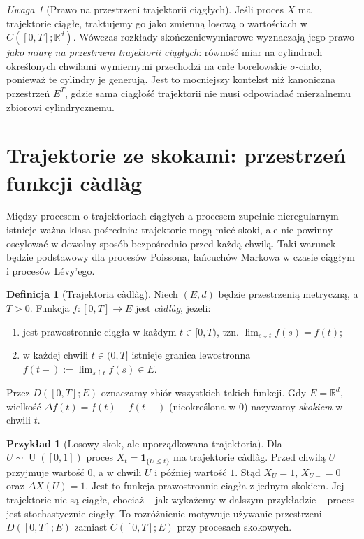 \documentclass[11pt,a4paper,oneside]{report}
\numberwithin{equation}{chapter}
\theoremstyle{plain}
\theoremstyle{definition}
\newtheorem{definicja}{Definicja}[chapter]
\newtheorem{przyklad}{Przykład}[chapter]
\theoremstyle{remark}
\newtheorem{uwaga}{Uwaga}[chapter]
\newcommand{\R}{\mathbb{R}}
\newcommand{\ind}[1]{\mathbf{1}_{#1}}
\begin{document}
\begin{uwaga}[Prawo na przestrzeni trajektorii ciągłych]
Jeśli proces $X$ ma trajektorie ciągłe, traktujemy go jako
zmienną losową o wartościach w $C([0,T];\R^d)$. Wówczas
rozkłady skończeniewymiarowe wyznaczają jego prawo
\emph{jako miarę na przestrzeni trajektorii ciągłych}:
równość miar na cylindrach określonych chwilami wymiernymi
przechodzi na całe borelowskie $\sigma$-ciało, ponieważ
te cylindry je generują. Jest to mocniejszy kontekst niż
kanoniczna przestrzeń $E^T$, gdzie sama ciągłość trajektorii
nie musi odpowiadać mierzalnemu zbiorowi cylindrycznemu.
\end{uwaga}

\section{Trajektorie ze skokami: przestrzeń funkcji c\`adl\`ag}
Między procesem o trajektoriach ciągłych a procesem
zupełnie nieregularnym istnieje ważna klasa pośrednia:
trajektorie mogą mieć skoki, ale nie powinny oscylować
w dowolny sposób bezpośrednio przed każdą chwilą.
Taki warunek będzie podstawowy dla procesów Poissona,
łańcuchów Markowa w czasie ciągłym i procesów Lévy'ego.

\begin{definicja}[Trajektoria c\`adl\`ag]
Niech $(E,d)$ będzie przestrzenią metryczną, a $T>0$.
Funkcja $f:[0,T]\to E$ jest \emph{c\`adl\`ag}, jeżeli:
\begin{enumerate}
\item jest prawostronnie ciągła w każdym $t\in[0,T)$,
tzn. $\lim_{s\downarrow t}f(s)=f(t)$;
\item w każdej chwili $t\in(0,T]$ istnieje
granica lewostronna
$f(t-):=\lim_{s\uparrow t}f(s)\in E$.
\end{enumerate}
Przez $D([0,T];E)$ oznaczamy zbiór wszystkich takich funkcji.
Gdy $E=\R^d$, wielkość $\Delta f(t)=f(t)-f(t-)$
(nieokreślona w $0$) nazywamy \emph{skokiem} w chwili $t$.
\end{definicja}

\begin{przyklad}[Losowy skok, ale uporządkowana trajektoria]
Dla $U\sim\operatorname{U}([0,1])$ proces
$X_t=\ind{\{U\le t\}}$ ma trajektorie c\`adl\`ag.
Przed chwilą $U$ przyjmuje wartość $0$,
a w chwili $U$ i później wartość $1$.
Stąd $X_U=1$, $X_{U-}=0$ oraz $\Delta X(U)=1$.
Jest to funkcja prawostronnie ciągła z jednym skokiem.
Jej trajektorie nie są ciągłe, chociaż -- jak wykażemy
w dalszym przykładzie -- proces jest stochastycznie ciągły.
To rozróżnienie motywuje używanie przestrzeni $D([0,T];E)$
zamiast $C([0,T];E)$ przy procesach skokowych.
\end{przyklad}
\end{document}
